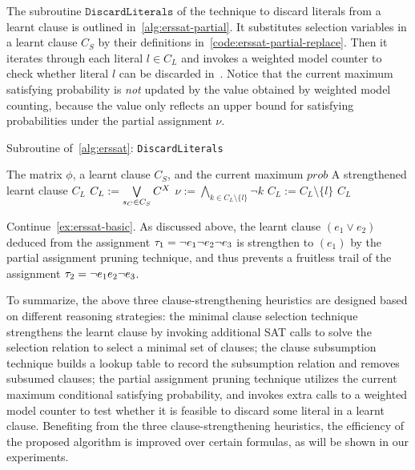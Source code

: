 The subroutine $\texttt{DiscardLiterals}$ of the technique to discard literals from a learnt clause is outlined in~\cref{alg:erssat-partial}.
It substitutes selection variables in a learnt clause $C_S$ by their definitions in~\cref{code:erssat-partial-replace}.
Then it iterates through each literal $l \in C_L$ and invokes a weighted model counter to check whether literal $l$ can be discarded in~.
Notice that the current maximum satisfying probability is \textit{not} updated by the value obtained by weighted model counting,
because the value only reflects an upper bound for satisfying probabilities under the partial assignment $\nu$.

\begin{algorithm}[ht]
    \caption{Subroutine of~\cref{alg:erssat}: \texttt{DiscardLiterals}}
    \label{alg:erssat-partial}
    \begin{algorithmic}[1]
        \REQUIRE The matrix $\phi$, a learnt clause $C_S$, and the current maximum $prob$
        \ENSURE A strengthened learnt clause $C_L$
        \STATE $C_L := \bigvee\limits_{s_{C}\in C_S}C^X$\label{code:erssat-partial-replace}
        \label{code:erssat-partial-drop-start}
        \STATE $\nu := \bigwedge\limits_{k\in C_L\setminus\{l\}}\lnot k$
        \STATE $C_L := C_L \setminus \{l\}$\label{code:erssat-partial-drop-end}
        \ENDIF
        \ENDFOR
        \RETURN $C_L$
    \end{algorithmic}
\end{algorithm}

\begin{example}
    \label{ex:erssat-partial}
    Continue~\cref{ex:erssat-basic}.
    As discussed above, the learnt clause $(e_1 \lor e_2)$ deduced from the assignment $\tau_1=\lnot e_1 \lnot e_2 \lnot e_3$ is strengthen to $(e_1)$ by the partial assignment pruning technique,
    and thus prevents a fruitless trail of the assignment $\tau_2=\lnot e_1 e_2 \lnot e_3$.
\end{example}

To summarize, the above three clause-strengthening heuristics are designed based on different reasoning strategies:
the minimal clause selection technique strengthens the learnt clause by invoking additional SAT calls to solve the selection relation to select a minimal set of clauses;
the clause subsumption technique builds a lookup table to record the subsumption relation and removes subsumed clauses;
the partial assignment pruning technique utilizes the current maximum conditional satisfying probability,
and invokes extra calls to a weighted model counter to test whether it is feasible to discard some literal in a learnt clause.
Benefiting from the three clause-strengthening heuristics,
the efficiency of the proposed algorithm is improved over certain formulas,
as will be shown in our experiments.

